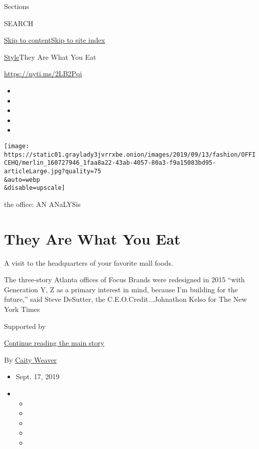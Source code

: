 Sections

SEARCH

\protect\hyperlink{site-content}{Skip to
content}\protect\hyperlink{site-index}{Skip to site index}

\href{/section/style}{Style}\textbar{}They Are What You Eat

\href{https://nyti.ms/2LB2Pqi}{https://nyti.ms/2LB2Pqi}

\begin{itemize}
\item
\item
\item
\item
\item
\end{itemize}

\texttt{[image: https://static01.graylady3jvrrxbe.onion/images/2019/09/13/fashion/OFFICEHQ/merlin\_160727946\_1faa8a22-43ab-4057-80a3-f9a15083bd95-articleLarge.jpg?quality=75\\\&auto=webp\\\&disable=upscale]}

the office: AN ANaLYSis

\hypertarget{they-are-what-you-eat}{%
\section{They Are What You Eat}\label{they-are-what-you-eat}}

A visit to the headquarters of your favorite mall foods.

The three-story Atlanta offices of Focus Brands were redesigned in 2015
``with Generation Y, Z as a primary interest in mind, because I'm
building for the future,'' said Steve DeSutter, the
C.E.O.Credit...Johnathon Kelso for The New York Times

Supported by

\protect\hyperlink{after-sponsor}{Continue reading the main story}

By \href{https://www.nytimes3xbfgragh.onion/by/caity-weaver}{Caity
Weaver}

\begin{itemize}
\item
  Sept. 17, 2019
\item
  \begin{itemize}
  \item
  \item
  \item
  \item
  \item
  \end{itemize}
\end{itemize}

